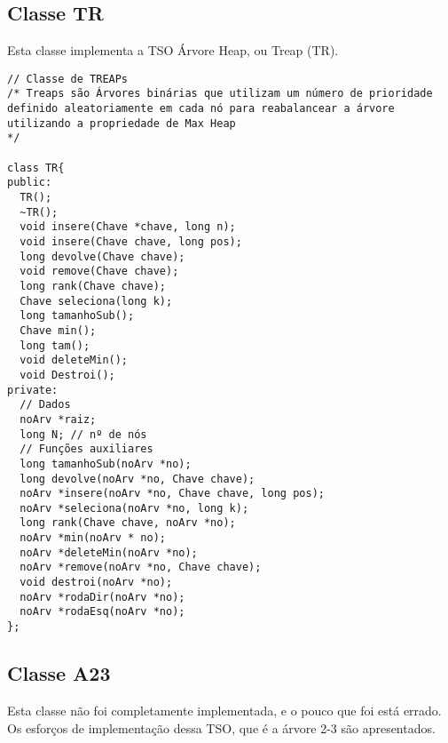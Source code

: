\documentclass[a4paper]{article}
\begin{document}
\subsection{Classe TR}
\label{sec:classe-tr}

Esta classe implementa a TSO Árvore Heap, ou Treap (TR).

\begin{verbatim}
// Classe de TREAPs
/* Treaps são Árvores binárias que utilizam um número de prioridade definido aleatoriamente em cada nó para reabalancear a árvore utilizando a propriedade de Max Heap
*/

class TR{
public:
  TR();
  ~TR();
  void insere(Chave *chave, long n);
  void insere(Chave chave, long pos);
  long devolve(Chave chave);
  void remove(Chave chave);
  long rank(Chave chave);
  Chave seleciona(long k);
  long tamanhoSub();
  Chave min();
  long tam();
  void deleteMin();
  void Destroi();
private:
  // Dados
  noArv *raiz; 
  long N; // nº de nós
  // Funções auxiliares
  long tamanhoSub(noArv *no);
  long devolve(noArv *no, Chave chave);
  noArv *insere(noArv *no, Chave chave, long pos);
  noArv *seleciona(noArv *no, long k);
  long rank(Chave chave, noArv *no);
  noArv *min(noArv * no);
  noArv *deleteMin(noArv *no);
  noArv *remove(noArv *no, Chave chave);
  void destroi(noArv *no);
  noArv *rodaDir(noArv *no);
  noArv *rodaEsq(noArv *no);
};
\end{verbatim}

\subsection{Classe A23}
\label{sec:classe-a23}

Esta classe não foi completamente implementada, e o pouco que foi está errado.
Os esforços de implementação dessa TSO, que é a árvore 2-3 são apresentados.
\end{document}
